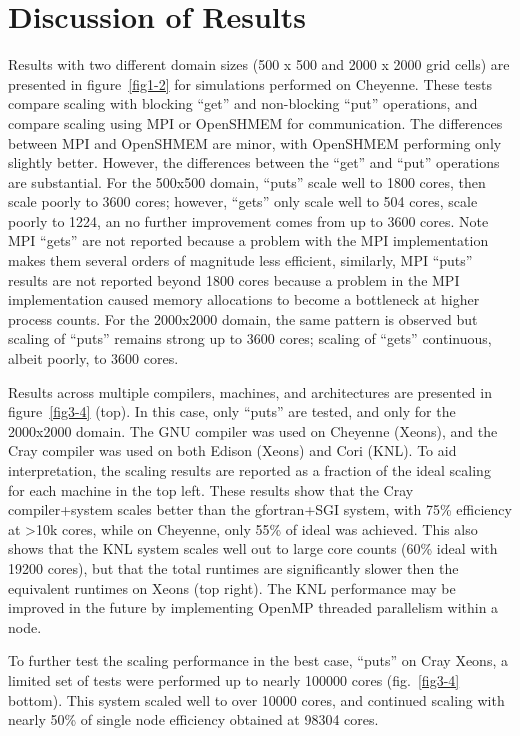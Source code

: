 \section{Discussion of Results}
Results with two different domain sizes (500 x 500 and 2000 x 2000 grid cells) are presented in figure~\ref{fig1-2} for simulations performed on Cheyenne.  
These tests compare scaling with blocking ``get'' and non-blocking ``put'' operations, and compare scaling using MPI or OpenSHMEM for communication.  
The differences between MPI and OpenSHMEM are minor, with OpenSHMEM performing only slightly better.  
However, the differences between the ``get'' and ``put'' operations are substantial.  
For the 500x500 domain, ``puts'' scale well to 1800 cores, then scale poorly to \num{3600} cores; 
however, ``gets'' only scale well to \num{504} cores, scale poorly to \num{1224}, an no further improvement comes from up to \num{3600} cores.  
Note MPI ``gets'' are not reported because a problem with the MPI implementation makes them several orders of magnitude less efficient, 
similarly, MPI ``puts'' results are not reported beyond \num{1800} cores because a problem in the MPI implementation caused memory allocations to become a bottleneck at higher process counts. 
For the 2000x2000 domain, the same pattern is observed but scaling of ``puts'' remains strong up to 3600 cores; 
scaling of ``gets'' continuous, albeit poorly, to \num{3600} cores. 

Results across multiple compilers, machines, and architectures are presented in figure~\ref{fig3-4} (top). 
In this case, only ``puts'' are tested, and only for the 2000x2000 domain. 
The GNU compiler was used on Cheyenne (Xeons), and the Cray compiler was used on both Edison (Xeons) and Cori (KNL).  
To aid interpretation, the scaling results are reported as a fraction of the ideal scaling for each machine in the top left.  
These results show that the Cray compiler+system scales better than the gfortran+SGI system, 
with 75\% efficiency at >10k cores, while on Cheyenne, only 55\% of ideal was achieved.
This also shows that the KNL system scales well out to large core counts (60\% ideal with \num{19200} cores), 
but that the total runtimes are significantly slower then the equivalent runtimes on Xeons (top right). 
The KNL performance may be improved in the future by implementing OpenMP threaded parallelism within a node.  

To further test the scaling performance in the best case, ``puts'' on Cray Xeons, a limited set of tests were performed up to nearly \num{100000} cores (fig.~\ref{fig3-4} bottom). 
This system scaled well to over \num{10000} cores, and continued scaling with nearly 50\% of single node efficiency obtained at \num{98304} cores. 

